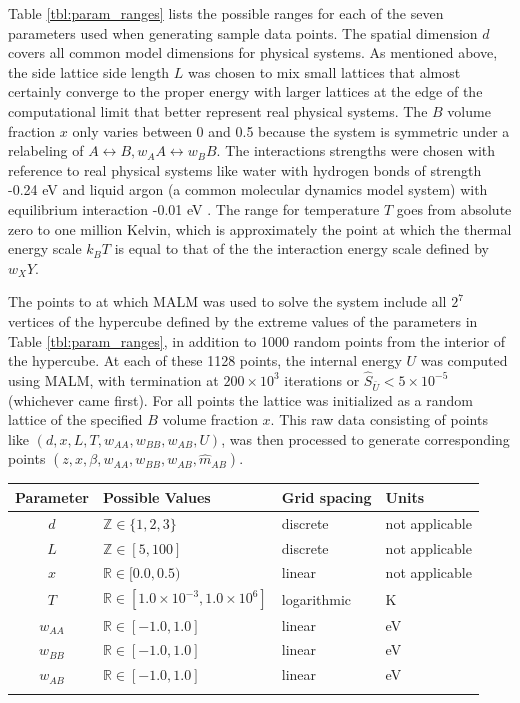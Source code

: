\documentclass[10pt]{article}
\begin{document}
Table \ref{tbl:param_ranges} lists the possible ranges for each of the seven parameters used when generating sample data points.
The spatial dimension $d$ covers all common model dimensions for physical systems.
As mentioned above, the side lattice side length $L$ was chosen to mix small lattices that almost certainly converge to the proper energy with larger lattices at the edge of the computational limit that better represent real physical systems.
The $B$ volume fraction $x$ only varies between 0 and 0.5 because the system is symmetric under a relabeling of $A \leftrightarrow B, w_AA \leftrightarrow w_BB$.
The interactions strengths were chosen with reference to real physical systems like water with hydrogen bonds of strength -0.24 eV and liquid argon (a common molecular dynamics model system) with equilibrium interaction -0.01 eV \cite{water} \cite{argon}.
The range for temperature $T$ goes from absolute zero to one million Kelvin, which is approximately the point at which the thermal energy scale $k_B T$ is equal to that of the the interaction energy scale defined by $w_XY$.

The points to at which MALM was used to solve the system include all $2^7$ vertices of the hypercube defined by the extreme values of the parameters in Table \ref{tbl:param_ranges}, in addition to 1000 random points from the interior of the hypercube.
At each of these 1128 points, the internal energy $U$ was computed using MALM, with termination at $200 \times 10^3$ iterations or $\hat{S}_{\bar{U}} < 5 \times 10^{-5}$ (whichever came first).
For all points the lattice was initialized as a random lattice of the specified $B$ volume fraction $x$.
This raw data consisting of points like $(d,x,L,T,w_{AA},w_{BB},w_{AB},U)$, was then processed to generate corresponding points $(z,x,\beta,w_{AA},w_{BB},w_{AB},\hat{m}_{AB})$.

\begin{center}
\begin{tabular}{c | l | l | l} 
    \hline
    Parameter & Possible Values & Grid spacing & Units \\  \hline
    $d$ & $\mathbb{Z} \in \{1,2,3\}$ & discrete & not applicable \\ \hline
    $L$ & $\mathbb{Z} \in [5,100]$ & discrete & not applicable \\ \hline
    $x$ & $\mathbb{R} \in [0.0,0.5)$ & linear & not applicable \\ \hline
    $T$ & $\mathbb{R} \in [1.0 \times 10^{-3},1.0 \times 10^6]$ & logarithmic & K \\ \hline
    $w_{AA}$ & $\mathbb{R} \in [-1.0, 1.0]$ & linear & eV \\ \hline
    $w_{BB}$ & $\mathbb{R} \in [-1.0, 1.0]$ & linear & eV \\ \hline
    $w_{AB}$ & $\mathbb{R} \in [-1.0, 1.0]$ & linear & eV \\
    \label{tbl:param_ranges}
\end{tabular}
\end{center}
\end{document}
